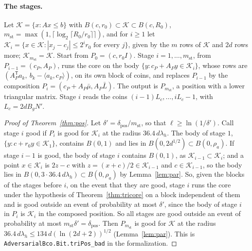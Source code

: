 \documentclass[11pt]{amsart}
\theoremstyle{definition}
\numberwithin{equation}{section}
\newcommand{\cK}{\mathcal{K}}
\newcommand{\ip}[1]{\langle #1\rangle}
\begin{document}
\paragraph{The stages.} Let $\cK=\{x:Ax\le b\}$ with $B(c,r_0)\subset\cK\subset B(c,R_0)$, $m_{\mathrm{st}}=\max(1,\lceil\log_2\lceil R_0/r_0\rceil\rceil)$, and for $i\ge1$ let $\cK_i=\{x\in\cK:|x_j-c_j|\le2^ir_0\text{ for every }j\}$, given by the $m$ rows of $\cK$ and $2d$ rows more; $\cK_{m_{\mathrm{st}}}=\cK$. Start from $P_0=(c,r_0I)$. Stage $i=1,\dots,m_{\mathrm{st}}$, from $P_{i-1}=(c_P,A_P)$, runs the core on the body $\{y:c_P+A_Py\in\cK_i\}$, whose rows are $(A_P^{\mathsf T}a_k,\ b_k-\ip{a_k,c_P})$, on its own block of coins, and replaces $P_{i-1}$ by the composition $P_i=(c_P+A_P\bar\mu,A_P\bar L)$. The output is $P_{m_{\mathrm{st}}}$, a position with a lower triangular matrix. Stage $i$ reads the coins $(i-1)L_c,\dots,iL_c-1$, with $L_c=2dB_gN'$.

\begin{proof}[Proof of Theorem~\ref{thm:pos}]
Let $\delta'=\delta_{\mathrm{pos}}/m_{\mathrm{st}}$, so that $\ell\ge\ln(1/\delta')$. Call stage $i$ good if $P_i$ is good for $\cK_i$ at the radius $36.4\,d\lambda_h$. The body of stage $1$, $\{y:c+r_0y\in\cK_1\}$, contains $B(0,1)$ and lies in $B(0,2d^{1/2})\subset B(0,\rho_a)$. If stage $i-1$ is good, the body of stage $i$ contains $B(0,1)$, as $\cK_{i-1}\subset\cK_i$; and a point $x\in\cK_i$ is $2z-c$ with $z=(x+c)/2\in\cK_{i-1}$ and $c\in\cK_{i-1}$, so the body lies in $B(0,3\cdot36.4\,d\lambda_h)\subset B(0,\rho_a)$ by Lemma~\ref{lem:par}. So, given the blocks of the stages before $i$, on the event that they are good, stage $i$ runs the core under the hypothesis of Theorem~\ref{thm:tricore} on a block independent of them and is good outside an event of probability at most $\delta'$, since the body of stage $i$ in $P_i$ is $\cK_i$ in the composed position. So all stages are good outside an event of probability at most $m_{\mathrm{st}}\delta'=\delta_{\mathrm{pos}}$. Then $P_{m_{\mathrm{st}}}$ is good for $\cK$ at the radius $36.4\,d\lambda_h\le134\,d(\ln(2d+2))^{1/2}$ (Lemma~\ref{lem:par}).
This is \texttt{AdversarialBco.Bit.triPos\_bad} in the formalization.
\end{proof}
\end{document}
